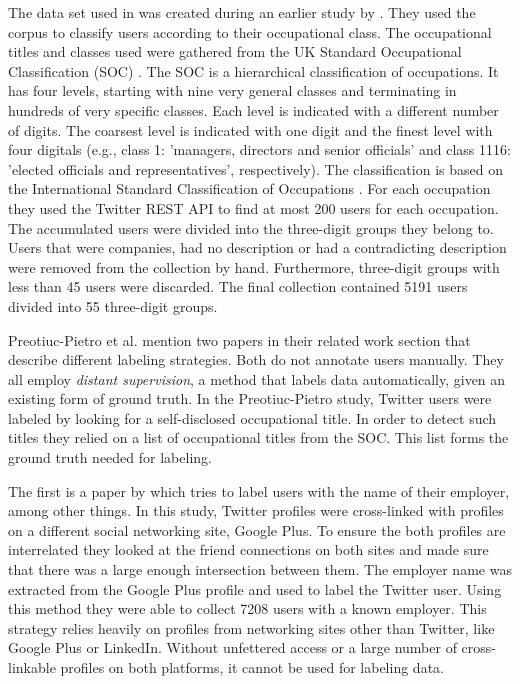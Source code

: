 \documentclass[
10pt, %
a4paper, %
oneside, %
headinclude,footinclude, %
] {book}%
\begin{document}
The data set used in \citet{flekova} was created during an earlier study by \citet{pietro}. They used the corpus to classify users according to their occupational class. 
The occupational titles and classes used were gathered from the UK Standard Occupational Classification (SOC) \citep{uksoc}. The SOC is a hierarchical classification of occupations. It has four levels, starting with nine very general classes and terminating in hundreds of very specific classes. Each level is indicated with a different number of digits. The coarsest level is indicated with one digit and the finest level with four digitals (e.g., class 1: 'managers, directors and senior officials' and class 1116: 'elected officials and representatives', respectively). The classification is based on the International Standard Classification of Occupations \citep{isco}.
For each occupation they used the Twitter REST API to find at most 200 users for each occupation. The accumulated users were divided into the three-digit groups they belong to. Users that were companies, had no description or had a contradicting description were removed from the collection by hand. Furthermore, three-digit groups with less than 45 users were discarded. The final collection contained 5191 users divided into 55 three-digit groups.

Preotiuc-Pietro et al. mention two papers in their related work section that describe different labeling strategies. Both do not annotate users manually. They all employ \textit{distant supervision}, a method that labels data automatically, given an existing form of ground truth. In the Preotiuc-Pietro study, Twitter users were labeled by looking for a self-disclosed occupational title. In order to detect such titles they relied on a list of occupational titles from the SOC. This list forms the ground truth needed for labeling.

The first is a paper by \citet{li} which tries to label users with the name of their employer, among other things. In this study, Twitter profiles were cross-linked with profiles on a different social networking site, Google Plus. To ensure the both profiles are interrelated they looked at the friend connections on both sites and made sure that there was a large enough intersection between them. The employer name was extracted from the Google Plus profile and used to label the Twitter user. Using this method they were able to collect 7208 users with a known employer. 
This strategy relies heavily on profiles from networking sites other than Twitter, like Google Plus or LinkedIn. Without unfettered access or a large number of cross-linkable profiles on both platforms, it cannot be used for labeling data.
\end{document}
